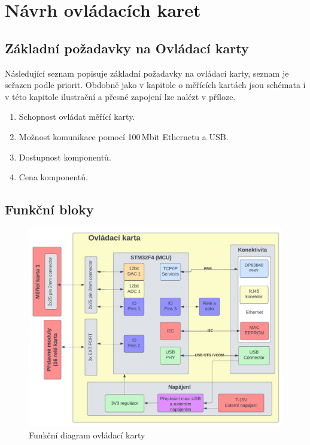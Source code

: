 \chapter{Návrh ovládacích karet}
\section{Základní požadavky na Ovládací karty}
    Následující seznam popisuje základní požadavky na ovládací karty, seznam je seřazen podle priorit.
    Obdobně jako v kapitole o měřících kartách jsou schémata i v této kapitole ilustrační a přesné zapojení
    lze nalézt v příloze. 
    \begin{enumerate}
        \item Schopnost ovládat měřící karty.
        \item Možnost komunikace pomocí 100\,Mbit Ethernetu a USB.
        \item Dostupnost komponentů.
        \item Cena komponentů.
    \end{enumerate}

    \section{Funkční bloky}
    \begin{figure}[ht!]
        \centering
        \includegraphics[width = 1\textwidth]{obrazky/ovladaci_karta_diag.png}
        \caption{Funkční diagram ovládací karty}
        \label{fig:Funkční diagram ovládací karty}
        
    \end{figure}


